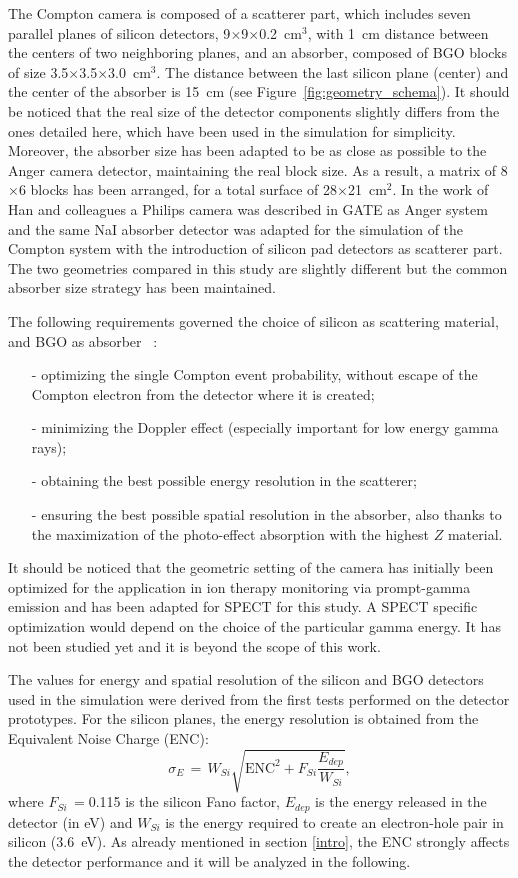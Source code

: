 The Compton camera is composed of a scatterer part, which includes seven parallel planes of silicon detectors, 9$\times$9$\times$0.2~cm$^{3}$, with 1~cm distance between the centers of two neighboring planes, and an absorber, composed of BGO blocks of size 3.5$\times$3.5$\times$3.0~cm$^{3}$. The distance between the last silicon plane (center) and the center of the absorber is 15~cm (see Figure~\ref{fig:geometry_schema}). It should be noticed that the real size of the detector components slightly differs from the ones detailed here, which have been used in the simulation for simplicity. Moreover, the absorber size has been adapted to be as close as possible to the Anger camera detector, maintaining the real block size. As a result, a matrix of 8$\times$6 blocks has been arranged, for a total surface of 28$\times$21~cm$^{2}$.
In the work of Han and colleagues \cite{HanComp} a Philips camera was described in GATE as Anger system and the same NaI absorber detector was adapted for the simulation of the Compton system with the introduction of silicon pad detectors as scatterer part. The two geometries compared in this study are slightly different but the common absorber size strategy has been maintained.
  
The following requirements governed the choice of silicon as scattering material, and BGO as absorber ~\cite{Richard2012}:
\begin{itemize}
\item[-] optimizing the single Compton event probability, without escape of the Compton electron from the detector where it is created;
\item[-] minimizing the Doppler effect (especially important for low energy gamma rays);
\item[-] obtaining the best possible energy resolution in the scatterer;
\item[-] ensuring the best possible spatial resolution in the absorber, also thanks to the maximization of the photo-effect absorption with the highest $Z$ material.
\end{itemize}
It should be noticed that the geometric setting of the camera has initially been optimized for the application in ion therapy monitoring via prompt-gamma emission and has been adapted for SPECT for this study. A SPECT specific optimization would depend on the choice of the particular gamma energy. It has not been studied yet and it is beyond the scope of this work.

The values for energy and spatial resolution of the silicon and BGO detectors used in the simulation were derived from the first tests performed on the detector prototypes. For the silicon planes, the energy resolution is obtained from the Equivalent Noise Charge (ENC):
\begin{equation}
\sigma_{E}\, = \,W_{Si} \sqrt{\mathrm{ENC}^{2} + F_{Si}\frac{E_{dep}}{W_{Si}}},
\label{E_res_ENC}
\end{equation}
where $F_{Si}\,=$0.115 is the silicon Fano factor, $E_{dep}$ is the energy released in the detector (in eV) and $W_{Si}$ is the energy required to create an electron-hole pair in silicon (3.6~eV). As already mentioned in section \ref{intro}, the ENC strongly affects the detector performance and it will be analyzed in the following. 

